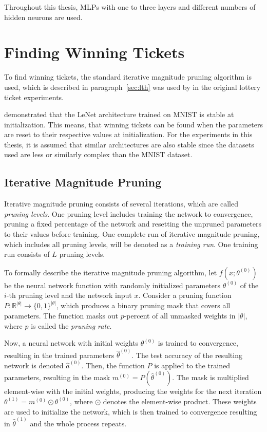 Throughout this thesis, MLPs with one to three layers and different numbers of hidden neurons are used.


\section{Finding Winning Tickets}
To find winning tickets, the standard iterative magnitude pruning algorithm is used, which is described in paragraph~\ref{sec:lth} was used by \textcite{LTH} in the original lottery ticket experiments.

\textcite{LinearModeConnectivity} demonstrated that the LeNet architecture trained on MNIST is stable at initialization.
This means, that winning tickets can be found when the parameters are reset to their respective values at initialization.
For the experiments in this thesis, it is assumed that similar architectures are also stable since the datasets used are less or similarly complex than the MNIST dataset.

\subsection{Iterative Magnitude Pruning}
Iterative magnitude pruning consists of several iterations, which are called  \textit{pruning levels}.
One pruning level includes training the network to convergence, pruning a fixed percentage of the network and resetting the unpruned parameters to their values before training.
One complete run of iterative magnitude pruning, which includes all pruning levels, will be denoted as a \textit{training run}.
One training run consists of $L$ pruning levels.

To formally describe the iterative magnitude pruning algorithm, let $f(x; \theta^{(0)})$ be the neural network function with randomly initialized parameters $\theta^{(0)}$ of the $i$-th pruning level and the network input $x$.
Consider a pruning function $\textit{P}: \mathbb{R}^{|\theta|} \to {\{0,1\}}^{|\theta|}$, which produces a binary pruning mask that covers all parameters.
The function masks out $p$-percent of all unmasked weights in $|\theta|$, where $p$ is called the \textit{pruning rate}.

Now, a neural network with initial weights $\theta^{(0)}$ is trained to convergence, resulting in the trained parameters $\hat \theta^{(0)}$.
The test accuracy of the resulting network is denoted $\hat a^{(0)}$.
Then, the function $\textit{P}$ is applied to the trained parameters, resulting in the mask $m^{(0)} = \textit{P}(\hat \theta^{(0)})$.
The mask is multiplied element-wise with the initial weights, producing the weights for the next iteration $\theta^{(1)} = m^{(0)} \odot \theta^{(0)}$, where $\odot$ denotes the element-wise product.
These weights are used to initialize the network, which is then trained to convergence resulting in $\hat \theta^{(1)}$ and the whole process repeats.

